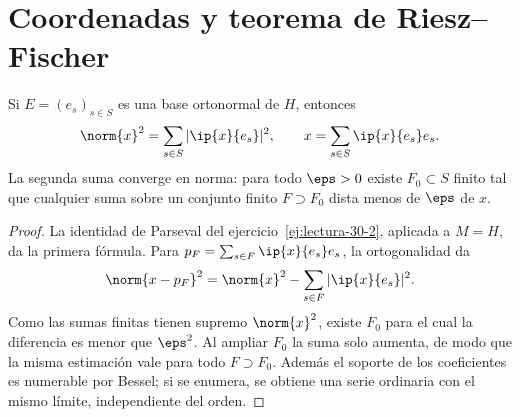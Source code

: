 \section{Coordenadas y teorema de Riesz--Fischer}
\begin{teorema}\label{ch31:parseval}
Si $E=(e_s)_{s\in S}$ es una base ortonormal de $H$, entonces
\[
 \norm{x}^{2}=\sum_{s\in S}|\ip{x}{e_s}|^{2},\qquad
 x=\sum_{s\in S}\ip{x}{e_s}e_s.
\]
La segunda suma converge en norma: para todo $\eps>0$ existe $F_0\subset S$ finito tal que cualquier suma sobre un conjunto finito $F\supset F_0$ dista menos de $\eps$ de $x$.
\end{teorema}
\begin{proof}
La identidad de Parseval del ejercicio~\ref{ej:lectura-30-2}, aplicada a $M=H$, da la primera fórmula. Para $p_F=\sum_{s\in F}\ip{x}{e_s}e_s$, la ortogonalidad da
\[
 \norm{x-p_F}^{2}=\norm{x}^{2}-\sum_{s\in F}|\ip{x}{e_s}|^{2}.
\]
Como las sumas finitas tienen supremo $\norm{x}^{2}$, existe $F_0$ para el cual la diferencia es menor que $\eps^{2}$. Al ampliar $F_0$ la suma solo aumenta, de modo que la misma estimación vale para todo $F\supset F_0$. Además el soporte de los coeficientes es numerable por Bessel; si se enumera, se obtiene una serie ordinaria con el mismo límite, independiente del orden.
\end{proof}

